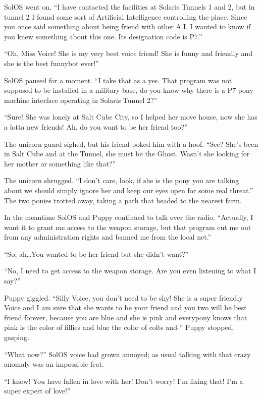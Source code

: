 SolOS went on, ``I have contacted the facilities at Solaris Tunnels 1 and 2, but in tunnel 2 I found some sort of Artificial Intelligence controlling the place. Since you once said something about being friend with other A.I. I wanted to know if you knew something about this one. Its designation code is P7.''

``Oh, Miss Voice! She is my very best voice friend! She is funny and friendly and she is the best funnybot ever!''

SolOS paused for a moment. ``I take that as a yes. That program was not supposed to be installed in a military base, do you know why there is a P7 pony machine interface operating in Solaris Tunnel 2?''

``Sure! She was lonely at Salt Cube City, so I helped her move house, now she has a lotta new friends! Ah, do you want to be her friend too?''

The unicorn guard sighed, but his friend poked him with a hoof. ``See? She's been in Salt Cube and at the Tunnel, she must be the Ghost. Wasn't she looking for her mother or something like that?''

The unicorn shrugged. ``I don't care, look, if she is the pony you are talking about we should simply ignore her and keep our eyes open for some real threat.'' The two ponies trotted away, taking a path that headed to the nearest farm.

In the meantime SolOS and Puppy continued to talk over the radio. ``Actually, I want it to grant me access to the weapon storage, but that program cut me out from any administration rights and banned me from the local net.''

``So, ah\dots You wanted to be her friend but she didn't want?''

``No, I need to get access to the weapon storage. Are you even listening to what I say?''

Puppy giggled. ``Silly Voice, you don't need to be shy! She is a super friendly Voice and I am sure that she wants to be your friend and you two will be best friend forever, because you are blue and she is pink and everypony knows that pink is the color of fillies and blue the color of colts and-'' Puppy stopped, gasping.

``What now?'' SolOS voice had grown annoyed; as usual talking with that crazy anomaly was an impossible feat.

``I know! You have fallen in love with her! Don't worry! I'm fixing that! I'm a super expert of love!''

